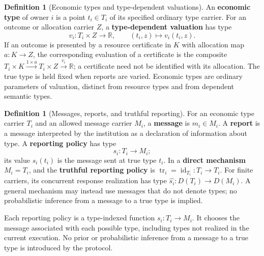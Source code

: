 \documentclass[11pt,a4paper]{article}
\numberwithin{equation}{section}
\theoremstyle{definition}
\newtheorem{definition}[theorem]{Definition}
\theoremstyle{remark}
\theoremstyle{plain}
\begin{document}
\begin{definition}[Economic types and type-dependent valuations]
\label{def:egt-economic-type}
An \textbf{economic type} of owner $i$ is a point $t_i\in T_i$ of
its specified ordinary type carrier. For an outcome or allocation
carrier $Z$, a \textbf{type-dependent valuation} has type
\[
 v_i:T_i\times Z\longrightarrow\mathbb R,\qquad
 (t_i,z)\longmapsto v_i(t_i,z).
\]
If an outcome is presented by a resource certificate in $K$ with
allocation map $a:K\to Z$, the corresponding evaluation of a
certificate is the composite
$T_i\times K\xrightarrow{1\times a}T_i\times Z
\xrightarrow{v_i}\mathbb R$; a certificate need not be identified with
its allocation. The true type is held fixed when reports are varied.
Economic types are ordinary parameters of valuation, distinct from
resource types and from dependent semantic types.
\end{definition}
\begin{definition}[Messages, reports, and truthful reporting]
\label{def:egt-messages-reports}
For an economic type carrier $T_i$ and an allowed message carrier
$M_i$, a \textbf{message} is $m_i\in M_i$. A \textbf{report} is a
message interpreted by the institution as a declaration of information
about type. A \textbf{reporting policy} has type
\[
 s_i:T_i\longrightarrow M_i;
\]
its value $s_i(t_i)$ is the message sent at true type $t_i$.
In a \textbf{direct mechanism} $M_i=T_i$, and the \textbf{truthful
reporting policy} is $\operatorname{tr}_i=\operatorname{id}_{T_i}:
T_i\to T_i$. For finite carriers, its concurrent response realization
has type $\widehat{s_i}:D(T_i)\to D(M_i)$.
A general mechanism may instead use messages that do not denote types;
no probabilistic inference from a message to a true type is implied.
\end{definition}
Each reporting policy is a type-indexed function
$s_i:T_i\to M_i$. It chooses the message associated with each
possible type, including types not realized in the current execution.
No prior or probabilistic inference from a message to a true type is
introduced by the protocol.
\end{document}
